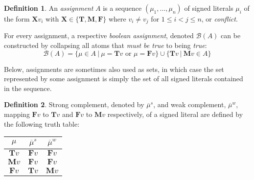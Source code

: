 \documentclass{vutinfth} %
\theoremstyle{example}
\theoremstyle{definition}
\newtheorem{definition}{Definition}[section]
\theoremstyle{theorem}
\theoremstyle{lemma}
\theoremstyle{corollary}
\newtheorem*{remark}{Remark}
\newcommand{\mbt}{must-be-true}
\newcommand{\negstrong}[1]{\overline{#1}^s}
\newcommand{\negweak}[1]{\overline{#1}^w}
\newcommand{\bass}{\mathcal{B}}
\newcommand{\ass}{A}
\newcommand{\bT}{\mathbf{T}}
\newcommand{\bM}{\mathbf{M}}
\newcommand{\bF}{\mathbf{F}}
\newcommand{\bX}{\mathbf{X}}
\newcommand{\sgl}{\mu}
\newcommand{\bsgl}{\sigma}
\newcommand{\thrice}{{\{\bT, \bM, \bF \}}}
\newcommand{\wkn}{\textit{weaken}}
\begin{document}


\begin{definition}
An \emph{assignment} $\ass$ is a sequence $(\sgl_1, \ldots, \sgl_n)$ of signed literals $\sgl_i$ of the form $\bX v_i$ with $\bX \in \thrice$ where $v_i \not = v_j$ for $1 \leq i < j \leq n$, or \emph{conflict}.

For every assignment, a respective \emph{boolean assignment}, denoted $\bass(\ass)$ can be constructed by collapsing all atoms that \emph{must be true} to being \emph{true}:$$\bass(\ass) = \{ \sgl \in \ass \ | \ \sgl = \bT v \textrm{ or } \sgl = \bF v \} \cup \{ \bT v \ | \ \bM v \in \ass \}$$
\end{definition}

Below, assignments are sometimes also used as sets, in which case the set represented by some assignment is simply the set of all signed literals contained in the sequence.

\begin{definition}
Strong complement, denoted by $\negstrong{\sgl}$, and weak complement, $\negweak{\sgl}$, mapping $\bF v$ to $\bT v$ and $\bF v$ to $\bM v$ respectively, of a signed literal are defined by the following truth table:%

\begin{center}
\begin{tabular}{|c|cc|}
\hline
$\sgl$&$\negstrong{\sgl}$&$\negweak{\sgl}$\\
\hline
\hline
$\bT v$&$\bF v$&$\bF v$\\
$\bM v$&$\bF v$&$\bF v$\\
$\bF v$&$\bT v$&$\bM v$\\
\hline
\end{tabular}
\end{center}
\end{definition}
\end{document}
